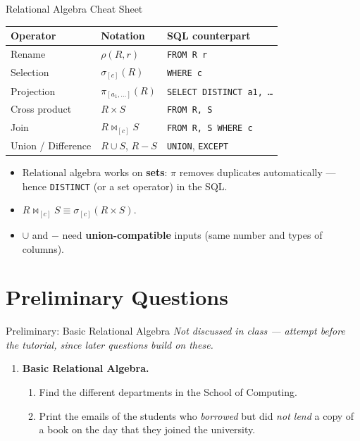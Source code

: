\documentclass{beamer}
\begin{document}
\begin{frame}{Relational Algebra Cheat Sheet}
\small
\begin{center}
\renewcommand{\arraystretch}{1.25}
\begin{tabular}{lll}
\toprule
\textbf{Operator} & \textbf{Notation} & \textbf{SQL counterpart} \\
\midrule
Rename    & $\rho(R, r)$              & \texttt{FROM R r} \\
Selection & $\sigma_{[c]}(R)$         & \texttt{WHERE c} \\
Projection& $\pi_{[a_1,\ldots]}(R)$   & \texttt{SELECT DISTINCT a1, \ldots} \\
Cross product & $R \times S$          & \texttt{FROM R, S} \\
Join      & $R \bowtie_{[c]} S$       & \texttt{FROM R, S WHERE c} \\
Union / Difference & $R \cup S$, $R - S$ & \texttt{UNION}, \texttt{EXCEPT} \\
\bottomrule
\end{tabular}
\end{center}
\medskip
\begin{itemize}
  \item Relational algebra works on \textbf{sets}: $\pi$ removes duplicates automatically --- hence \texttt{DISTINCT} (or a set operator) in the SQL.
  \item $R \bowtie_{[c]} S \equiv \sigma_{[c]}(R \times S)$.
  \item $\cup$ and $-$ need \textbf{union-compatible} inputs (same number and types of columns).
\end{itemize}
\end{frame}

\section{Preliminary Questions}

\begin{frame}{Preliminary: Basic Relational Algebra}
\small
\textit{Not discussed in class --- attempt before the tutorial, since later questions build on these.}
\begin{enumerate}
  \item[\textbf{1.}] \textbf{Basic Relational Algebra.}
  \begin{enumerate}
    \item[(a)] Find the different departments in the School of Computing.
    \item[(b)] Print the emails of the students who \emph{borrowed} but did \emph{not lend} a copy of a book on the day that they joined the university.
  \end{enumerate}
\end{enumerate}
\end{frame}
\end{document}
